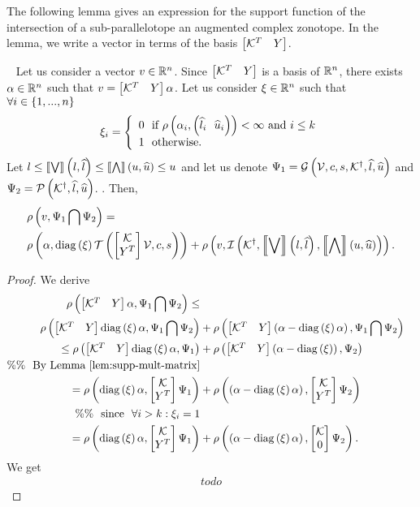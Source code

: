 The following
lemma gives an expression for the support function of the intersection
of a sub-parallelotope an augmented complex zonotope.  In the lemma, we
write a vector in terms of the basis $\mymatrix{\transpose{\qtemp} & Y}$.
%
\begin{lemma}~\label{lem:supp-intersection}
Let us consider a vector $v\in\reals^n$. Since $\mymatrix{\qtemp^T &
Y}$ is a basis of $\reals^n$, there exists $\alpha\in\reals^n$ such that
$v=\mymatrix{\qtemp^T & Y}\alpha$.  Let us consider $\xi\in\reals^n$ such
that $\forall i\in\set{1,...,n}$
%
\[
\xi_i=
\lt\{\begin{array}{l}
0~~\text{if}~\supp{\alpha_i}{\lt(\plb_i~~\pub_i\rt)}<\infty~\text{and}~i\leq k\\
1~~\text{otherwise}.
\end{array}
\right.
\]
%
Let $\lb\leq\maxapprox{\lb}{\plb}\leq\minapprox{\ub}{\pub}\leq\ub$ and
let us denote
$\Psi_1=\acztope{\ptemp}{\cen}{\sfact}{\pinv{\qtemp}}{\plb}{\pub}$ and
$\Psi_2=\ptope{\pinv{\qtemp}}{\plb}{\pub}$. .  Then,
\begin{align*}
& \supp{v}{\Psi_1\bigcap\Psi_2}=\\
& \supp{\alpha}{\diagonal{\xi}\tcztope{\mymatrix{\qtemp\\
Y^T}\ptemp}{\cen}{\sfact}}
 +\supp{v}{\iztope{\pinv{\qtemp}}{\maxapprox{\lb}{\plb}}{\minapprox{\ub}{\pub}}}.
\end{align*}
%
\end{lemma}
%
\begin{proof}
We derive
%
\begin{align}
\supp{\mymatrix{\qtemp^T & Y}\alpha}{\Psi_1\bigcap\Psi_2}
\leq \nonumber\\
\supp{\mymatrix{\qtemp^T &
Y}\diagonal{\xi}\alpha}{\Psi_1\bigcap\Psi_2}
& +\supp{\mymatrix{\qtemp^T
& Y}\lt(\alpha-\diagonal{\xi}\alpha\rt)}{\Psi_1\bigcap\Psi_2}\nonumber\\
\leq \supp{\mymatrix{\qtemp^T &
Y}\diagonal{\xi}\alpha}{\Psi_1}
& +\supp{\mymatrix{\qtemp^T &
Y}\lt(\alpha-\diagonal{\xi}\rt)}{\Psi_2}\nonumber\\
\%\%~~\text{By Lemma~\ref{lem:supp-mult-matrix}}\nonumber\\
= \supp{\diagonal{\xi}\alpha}{\mymatrix{\qtemp \\
Y^T}\Psi_1}
& +\supp{\lt(\alpha-\diagonal{\xi}\alpha\rt)}{\mymatrix{\qtemp \\
Y^T}\Psi_2}\nonumber\\
\%\%~~\text{since}~~\forall i>k:\xi_i=1\nonumber\\
= \supp{\diagonal{\xi}\alpha}{\mymatrix{\qtemp \\
Y^T}\Psi_1}
& +\supp{\lt(\alpha-\diagonal{\xi}\alpha\rt)}{\mymatrix{\qtemp \\
0}\Psi_2}.
\end{align}
%
We get
%
\begin{align*}
todo
\end{align*}
%
\end{proof}
%




























